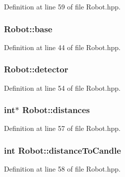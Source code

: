 Definition at line 59 of file Robot.\-hpp.

\hypertarget{classRobot_adbf538f97c0f9f98337f5171e715badc}{
\subsubsection[{base}]{ Robot\-::base}}\label{classRobot_adbf538f97c0f9f98337f5171e715badc}


Definition at line 44 of file Robot.\-hpp.

\hypertarget{classRobot_a19cb4c2ee87b595db9275e6b3d9ca30d}{
\subsubsection[{detector}]{ Robot\-::detector\hspace{0.3cm}{\ttfamily [private]}}}\label{classRobot_a19cb4c2ee87b595db9275e6b3d9ca30d}


Definition at line 54 of file Robot.\-hpp.

\hypertarget{classRobot_aba9dccea96aa95bb8fbdd1a5ba72ca73}{
\subsubsection[{distances}]{\setlength{\rightskip}{0pt plus 5cm}int$\ast$ Robot\-::distances\hspace{0.3cm}{\ttfamily [private]}}}\label{classRobot_aba9dccea96aa95bb8fbdd1a5ba72ca73}


Definition at line 57 of file Robot.\-hpp.

\hypertarget{classRobot_afae387e4e9419530d3217055301ba939}{
\subsubsection[{distance\-To\-Candle}]{\setlength{\rightskip}{0pt plus 5cm}int Robot\-::distance\-To\-Candle\hspace{0.3cm}{\ttfamily [private]}}}\label{classRobot_afae387e4e9419530d3217055301ba939}


Definition at line 58 of file Robot.\-hpp.

